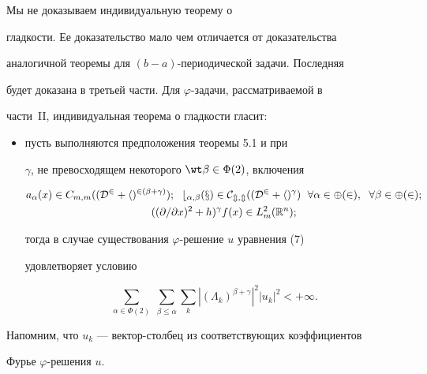 \begin{notes} 


Мы не доказываем индивидуальную теорему о  


гладкости. Ее доказательство мало чем отличается от доказательства  


аналогичной теоремы для $(b{-}a)$-периодической задачи. Последняя  


будет доказана в третьей части. Для $\varphi$-задачи, рассматриваемой в  


части~II, индивидуальная теорема о гладкости гласит: 


\begin{itemize} 


\item[\phantom{m}] пусть выполняются предположения теоремы 5.1 и при 


$\gamma$, не превосходящем некоторого $\wt\beta\in\Phi(2)$, включения 


\begin{gather*} 


a_\alpha(x)\in C_{m,m}((\cal D^2+h)^{2(\beta+\gamma)});\ \; 


b_{\alpha,\beta}(x)\in C_{m,m}((\cal D^2+h)^\gamma)\ \; \forall 


\alpha\in\Phi(2),\ \;\forall\beta\in\Phi(2); \\


((\partial/\partial x)^2+h)^\gamma f(x)\in L^2_m(\Bbb R^n); 


\end{gather*}  


тогда в случае существования $\varphi$-решение $u$ уравнения (7) 


удовлетворяет условию 


$$ 


\sum_{\alpha\in\Phi(2)}\;\sum_{\beta\le\alpha}\sum_k 


|(\Lambda_k)^{\beta+\gamma}|^2|u_k|^2<+\infty. 


$$ 


\end{itemize} 


Напомним, что $u_k$ --- вектор-столбец из соответствующих коэффициентов  


Фурье $\varphi$-решения $u$. 


\end{notes} 


 



